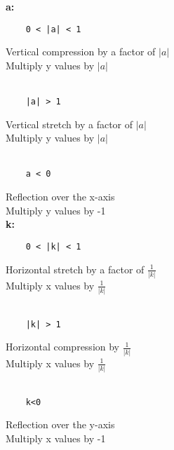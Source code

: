 \documentclass{article}
\begin{document}
    \begin{multicols}{2}

    \noindent
    \textbf{a:}
    \begin{verbatim}
    0 < |a| < 1
    \end{verbatim}
    \noindent
    Vertical compression by a factor of $|a|$\\
    Multiply y values by $|a|$\\\\
    \begin{verbatim}
    |a| > 1
    \end{verbatim}
    \noindent
    Vertical stretch by a factor of $|a|$\\
    Multiply y values by $|a|$\\\\
    \begin{verbatim}
    a < 0
    \end{verbatim}
    \noindent
    Reflection over the x-axis\\
    Multiply y values by -1\\

    \columnbreak
    \noindent
    \textbf{k:}
    \begin{verbatim}
    0 < |k| < 1
    \end{verbatim}
    \noindent
    Horizontal stretch by a factor of $\frac{1}{|k|}$\\
    Multiply x values by $\frac{1}{|k|}$\\\\
    \begin{verbatim}
    |k| > 1
    \end{verbatim}
    \noindent
    Horizontal compression by $\frac{1}{|k|}$\\
    Multiply x values by $\frac{1}{|k|}$\\\\
    \begin{verbatim}
    k<0
    \end{verbatim}
    \noindent
    Reflection over the y-axis\\
    Multiply x values by -1

    \end{multicols}
\end{document}
